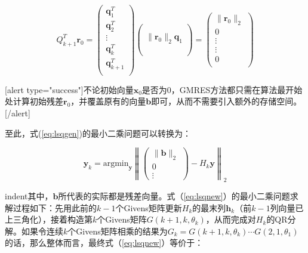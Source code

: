 \documentclass[UTF8,nofonts]{ctexart}
\begin{document}
\begin{equation*}
	Q^T_{k+1}\boldsymbol{r}_0=
	\begin{pmatrix}
		\boldsymbol{q}_1^T \\ \boldsymbol{q}_2^T \\ \vdots \\
		\boldsymbol{q}_k^T \\ \boldsymbol{q}^T_{k+1} \\
	\end{pmatrix}
	\begin{pmatrix}
		~ \\ ~ \\ \|\boldsymbol{r}_0\|_2\boldsymbol{q}_1 \\ ~ \\ ~ \\
	\end{pmatrix} =
	\begin{pmatrix}
		\|\boldsymbol{r}_0\|_2 \\ 0 \\ \vdots \\ \vdots \\ 0 \\
	\end{pmatrix}
\end{equation*}

[alert type="success"]不论初始向量$\boldsymbol{x}_0$是否为$0$，GMRES方法都只需在算法最开始处计算初始残差$\boldsymbol{r}_0$，并覆盖原有的向量$\boldsymbol{b}$即可，从而不需要引入额外的存储空间。[/alert]

至此，式(\ref{eq:lsqgen})的最小二乘问题可以转换为：

\begin{equation}
	\label{eq:lsqnew}
	\boldsymbol{y}_k=\text{argmin}_{\boldsymbol{y}}
	\left\|
		\begin{pmatrix}
			\|\boldsymbol{b}\|_2 \\ 0 \\ \vdots
		\end{pmatrix}
		-H_k\boldsymbol{y}
	\right\|_2
\end{equation}

indent其中，$\boldsymbol{b}$所代表的实际都是残差向量。式（\ref{eq:lsqnew}）的最小二乘问题求解过程如下：先用此前的$k-1$个Givens矩阵更新$H_k$的最末列$\boldsymbol{h}_k$（前$k-1$列向量已上三角化），接着构造第$k$个Givens矩阵$G(k+1,k,\theta_k)$，从而完成对$H_k$的QR分解。如果令连续$k$个Givens矩阵相乘的结果为$G_k=G(k+1,k,\theta_k)\cdots G(2,1,\theta_1)$的话，那么整体而言，最终式（\ref{eq:lsqnew}）等价于：
\end{document}
